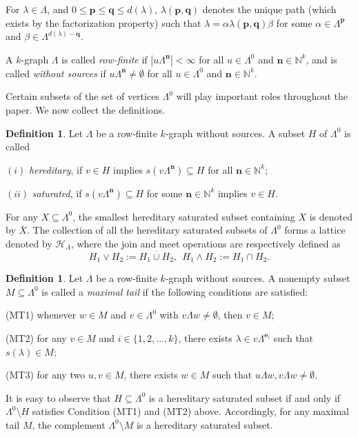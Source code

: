 \documentclass[a4paper,reqno,12pt]{amsart}
\numberwithin{equation}{section}
\theoremstyle{definition}
\newtheorem{dfn}[thm]{Definition}
\theoremstyle{remark}
\newcommand{\N}{\mathbf{n}}
\newcommand{\bP}{\mathbf{p}}
\newcommand{\Q}{\mathbf{q}}
\begin{document}
For $\lambda\in \Lambda$, and $0\le \bP\le \Q\le d(\lambda)$, $\lambda(\bP,\Q)$ denotes the unique path (which exists by the factorization property) such that $\lambda=\alpha \lambda(\bP,\Q)\beta$ for some $\alpha\in \Lambda^{\bP}$ and $\beta\in \Lambda^{d(\lambda)-\Q}$.

A $k$-graph $\Lambda$ is called \emph{row-finite} if $|u\Lambda^\N|<\infty$ for all $u\in \Lambda^0$ and $\N\in \mathbb{N}^k$, and is called \emph{without sources} if $u\Lambda^\N\neq \emptyset$ for all $u\in \Lambda^0$ and $\N\in \mathbb{N}^k$. 

Certain subsets of the set of vertices $\Lambda^0$ will play important roles throughout the paper. We now collect the definitions.
\begin{dfn}\label{def H and S subsets}
Let $\Lambda$ be a row-finite $k$-graph without sources. A subset $H$ of $\Lambda^0$ is called 

$(i)$ \emph{hereditary}, if $v\in H$ implies $s(v\Lambda^\N)\subseteq H$ for all $\N\in \mathbb{N}^k$;

$(ii)$ \emph{saturated}, if $s(v\Lambda^\N)\subseteq H$ for some $\N\in \mathbb{N}^k$ implies $v\in H$. 
\end{dfn}
For any $X\subseteq \Lambda^0$, the smallest hereditary saturated subset containing $X$ is denoted by $\overline{X}$. The collection of all the hereditary saturated subsets of $\Lambda^0$ forms a lattice denoted by $\mathcal{H}_\Lambda$, where the join and meet operations are respectively defined as \[H_1\vee H_2:=\overline{H_1\cup H_2},~~H_1\wedge H_2:=H_1\cap H_2.\]
\begin{dfn}\label{def maximal tail}
Let $\Lambda$ be a row-finite $k$-graph without sources. A nonempty subset $M\subseteq \Lambda^0$ is called a \emph{maximal tail} if the following conditions are satisfied:

(MT1) whenever $w\in M$ and $v\in \Lambda^0$ with $v\Lambda w\neq \emptyset$, then $v\in M$;

(MT2) for any $v\in M$ and $i\in \{1,2,\ldots,k\}$, there exists $\lambda\in v\Lambda^{\mathbf{e}_i}$ such that $s(\lambda)\in M$;

(MT3) for any two $u,v\in M$, there exists $w\in M$ such that $u\Lambda w, v\Lambda w\neq \emptyset$. 
\end{dfn}

It is easy to observe that $H\subseteq \Lambda^0$ is a hereditary saturated subset if and only if $\Lambda^0\setminus H$ satisfies Condition (MT1) and (MT2) above. Accordingly, for any maximal tail $M$, the complement $\Lambda^0\setminus M$ is a hereditary saturated subset.
\end{document}
